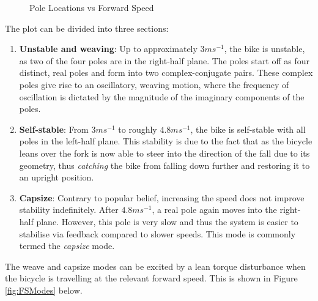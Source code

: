 \begin{figure}[H]
	\centering
	\caption{Pole Locations vs Forward Speed}
	\label{fig:PoleVsSpeed}
\end{figure}

The plot can be divided into three sections:

\begin{enumerate}
\item{\textbf{Unstable and weaving}: Up to approximately $3ms^{-1}$, the bike is unstable, as two of the four poles are in the right-half plane. The poles start off as four distinct, real poles and form into two complex-conjugate pairs. These complex poles give rise to an oscillatory, weaving motion, where the frequency of oscillation is dictated by the magnitude of the imaginary components of the poles.}
\item{\textbf{Self-stable}: From $3ms^{-1}$ to roughly $4.8ms^{-1}$, the bike is self-stable with all poles in the left-half plane. This stability is due to the fact that as the bicycle leans over the fork is now able to steer into the direction of the fall due to its geometry, thus \textit{catching} the bike from falling down further and restoring it to an upright position.}
\item{\textbf{Capsize}: Contrary to popular belief, increasing the speed does not improve stability indefinitely. After $4.8ms^{-1}$, a real pole again moves into the right-half plane. However, this pole is very slow and thus the system is easier to stabilise via feedback compared to slower speeds. This mode is commonly termed the \textit{capsize} mode.}
\end{enumerate}

The weave and capsize modes can be excited by a lean torque disturbance when the bicycle is travelling at the relevant forward speed. This is shown in Figure \ref{fig:FSModes} below.

